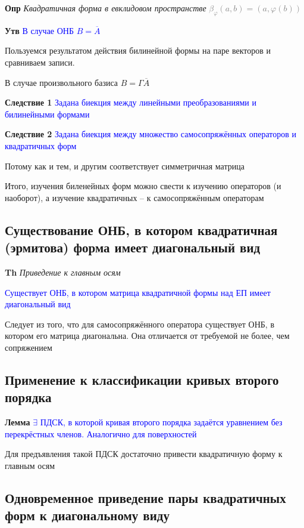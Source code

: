 \documentclass[a4paper, 14pt]{article}
\begin{document}
    \textbf{Опр} \textit{Квадратичная форма в евклидовом пространстве} \textcolor{gray}{$\beta_\varphi (a, b) = (a, \varphi(b))$}
    
    \textbf{Утв} \textcolor{blue}{В случае ОНБ $B = \overline{A}$}
    
    Пользуемся результатом действия билинейной формы на паре векторов и сравниваем записи.
    
    В случае произвольного базиса $B = \Gamma \overline{A}$
    
    \textbf{Следствие 1} \textcolor{blue}{Задана биекция между линейными преобразованиями и билинейными формами}
    
    \textbf{Следствие 2} \textcolor{blue}{Задана биекция между множество самосопряжённых операторов и квадратичных форм}
    
    Потому как и тем, и другим соответствует симметричная матрица
    
    Итого, изучения биленейных форм можно свести к изучению операторов (и наоборот), а изучение квадратичных -- к
    самосопряжённым операторам
    
    \subsection{Существование ОНБ, в котором квадратичная (эрмитова) форма имеет диагональный вид}
    
    \textbf{Th} \textit{Приведение к главным осям}
    
    \textcolor{blue}{Существует ОНБ, в котором матрица квадратичной формы над ЕП имеет диагональный вид}
    
    Следует из того, что для самосопряжённого оператора существует ОНБ, в котором его матрица диагональна.
    Она отличается от требуемой не более, чем сопряжением
    
    \subsection{Применение к классификации кривых второго порядка}
    
    \textbf{Лемма} \textcolor{blue}{$\exists$ ПДСК, в которой кривая второго порядка задаётся уравнением без
    перекрёстных членов. Аналогично для поверхностей}
    
    Для предъявления такой ПДСК достаточно привести квадратичную форму к главным осям
    
    \subsection{Одновременное приведение пары квадратичных форм к диагональному виду}
    
\end{document}
